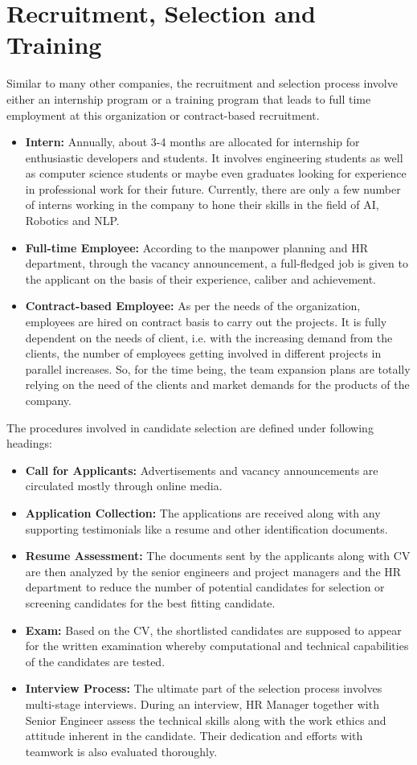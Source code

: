 \documentclass[12pt,a4paper]{scrreprt}
\begin{document}
\section{Recruitment, Selection and Training}
Similar to many other companies, the recruitment and selection process involve either an internship program or a training program that leads to full time employment at this organization or contract-based recruitment.
	\begin{itemize}
		\item \textbf{Intern:} Annually, about 3-4 months are allocated for internship for enthusiastic developers and students. It involves engineering students as well as computer science students or maybe even graduates looking for experience in professional work for their future. Currently, there are only a few number of interns working in the company to hone their skills in the field of AI, Robotics and NLP.
		\item \textbf{Full-time Employee:} According to the manpower planning and HR department, through the vacancy announcement, a full-fledged job is given to the applicant on the basis of their experience, caliber and achievement.
		\item \textbf{Contract-based Employee:} As per the needs of the organization, employees are hired on contract basis to carry out the projects. It is fully dependent on the needs of client, i.e. with the increasing demand from the clients, the number of employees getting involved in different projects in parallel increases. So, for the time being, the team expansion plans are totally relying on the need of the clients and market demands for the products of the company.
	\end{itemize}
	
The procedures involved in candidate selection are defined under following headings:
	\begin{itemize}
		\item \textbf{Call for Applicants:} Advertisements and vacancy announcements are circulated mostly through online media.
		\item \textbf{Application Collection:} The applications are received along with any supporting testimonials like a resume and other identification documents.
		\item \textbf{Resume Assessment:} The documents sent by the applicants along with CV are then analyzed by the senior engineers and project managers and the HR department to reduce the number of potential candidates for selection or screening candidates for the best fitting candidate.
		\item \textbf{Exam:} Based on the CV, the shortlisted candidates are supposed to appear for the written examination whereby computational and technical capabilities of the
candidates are tested.
		\item \textbf{Interview Process:} The ultimate part of the selection process involves multi-stage interviews. During an interview, HR Manager together with Senior Engineer assess
the technical skills along with the work ethics and attitude inherent in the candidate. Their dedication and efforts with teamwork is also evaluated thoroughly.
	\end{itemize}
\end{document}
